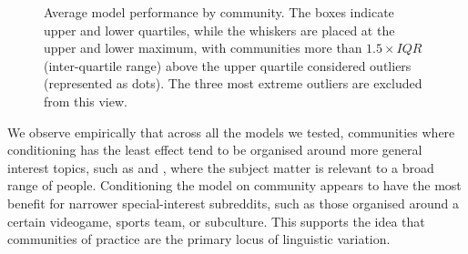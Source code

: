 \documentclass[11pt]{article}
\begin{document}
\newcommand{\modelboxplot}[3]{
  \addplot+[
    boxplot={draw position=#3, box extend=0.3}, 
    draw=#2, mark=*, mark options={fill=#2, scale=0.5}, solid, fill=#2!10,
    area legend] 
    table [y=#1] {floats/comm.csv};
}
\begin{figure}[t]
\caption{
  Average model performance by community.
The boxes indicate upper and lower quartiles, while the whiskers are placed at the upper and lower maximum, with communities more than $1.5\times IQR$ (inter-quartile range) above the upper quartile considered outliers (represented as dots). The three most extreme outliers are excluded from this view.}%
\label{fig:comm-stratified-box}
\end{figure}

We observe empirically that across all the models we
tested, communities where conditioning has the least effect tend to be
organised around more general interest topics, such as 
 and , where the subject
matter is relevant to a broad range of people.  Conditioning the model
on community appears to have the most benefit for narrower special-interest
subreddits, such as those organised around a certain videogame, sports
team, or subculture.  This supports the idea that communities of practice
are the primary locus of linguistic variation.
\end{document}
